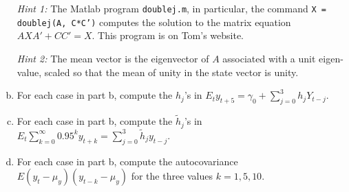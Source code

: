 \documentclass{homework}
\begin{document}
\begin{homeworkProblem}[Problem 2.4]
\begin{enumerate}[a.]
       \textit{Hint 1:} The Matlab program \texttt{doublej.m}, in particular, the command \texttt{X = doublej(A, C*C')} computes the solution to the matrix equation $AXA' + CC' = X$. This program is on Tom's website.

       \textit{Hint 2:} The mean vector is the eigenvector of $A$ associated with a unit eigen- value, scaled so that the mean of unity in the state vector is unity.

      \item For each case in part b, compute the $h_j$'s in $E_t y_{t+5} = \gamma_0 + \sum_{j=0}^3 h_j Y_{t-j}$.

      \item For each case in part b, compute the $\tilde{h}_j$'s in $E_t \sum_{k=0}^{\infty} 0.95^ky_{t+k} = \sum_{j=0}^3 \tilde{h}_j y_{t-j}$.

      \item For each case in part b, compute the autocovariance $E(y_t - \mu_y)(y_{t-k} - \mu_y)$ for the three values $k = 1, 5, 10$.
   \end{enumerate}

  \vspace{.2in}

\end{homeworkProblem}
\end{document}
